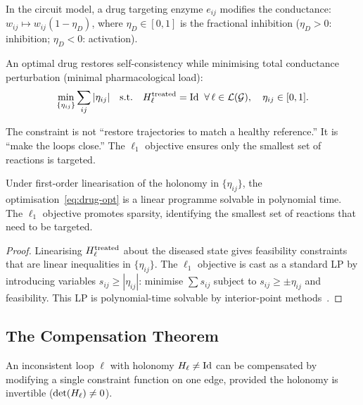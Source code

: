 In the circuit model, a drug targeting enzyme $e_{ij}$ modifies the
conductance: $w_{ij} \mapsto w_{ij}(1 - \eta_D)$, where
$\eta_D \in [0,1]$ is the fractional inhibition ($\eta_D > 0$: inhibition;
$\eta_D < 0$: activation).

\begin{definition}
\label{def:drug-design}
An optimal drug restores self-consistency while minimising total conductance
perturbation (minimal pharmacological load):
\begin{equation}
  \min_{\{\eta_{ij}\}} \sum_{ij} |\eta_{ij}|
  \quad \text{s.t.}
  \quad H_\ell^{\mathrm{treated}} = \mathrm{Id} \;\; \forall\, \ell \in \mathcal{L}(\mathcal{G}),
  \quad \eta_{ij} \in [0,1].
  \label{eq:drug-opt}
\end{equation}
\end{definition}

\begin{remark}
The constraint is not ``restore trajectories to match a healthy reference.''
It is ``make the loops close.''  The $\ell_1$ objective ensures only the
smallest set of reactions is targeted.
\end{remark}

\begin{proposition}
\label{prop:drug-lp}
Under first-order linearisation of the holonomy in $\{\eta_{ij}\}$, the
optimisation~\eqref{eq:drug-opt} is a linear programme solvable in
polynomial time.  The $\ell_1$ objective promotes sparsity, identifying
the smallest set of reactions that need to be targeted.
\end{proposition}

\begin{proof}
Linearising $H_\ell^{\mathrm{treated}}$ about the diseased state gives
feasibility constraints that are linear inequalities in $\{\eta_{ij}\}$.
The $\ell_1$ objective is cast as a standard LP by introducing variables
$s_{ij} \geq |\eta_{ij}|$: minimise $\sum s_{ij}$ subject to
$s_{ij} \geq \pm\eta_{ij}$ and feasibility.  This LP is polynomial-time
solvable by interior-point methods~\citep{Dantzig1963}.
\end{proof}

\subsection{The Compensation Theorem}

\begin{theorem}[Compensation]
\label{thm:compensation}
An inconsistent loop $\ell$ with holonomy $H_\ell \neq \mathrm{Id}$ can
be compensated by modifying a single constraint function on one edge,
provided the holonomy is invertible ($\det(H_\ell) \neq 0$).
\end{theorem}

